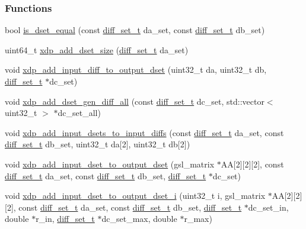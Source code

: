 \subsubsection*{\-Functions}
\begin{DoxyCompactItemize}
\item 
bool \hyperlink{xdp-add-diff-set_8hh_a3337e02c48bbe07e1e0d64da346c955f}{is\-\_\-dset\-\_\-equal} (const \hyperlink{structdiff__set__t}{diff\-\_\-set\-\_\-t} da\-\_\-set, const \hyperlink{structdiff__set__t}{diff\-\_\-set\-\_\-t} db\-\_\-set)
\item 
uint64\-\_\-t \hyperlink{xdp-add-diff-set_8hh_a93cd4e95c6e49a2837bc72fa68ffa1e5}{xdp\-\_\-add\-\_\-dset\-\_\-size} (\hyperlink{structdiff__set__t}{diff\-\_\-set\-\_\-t} da\-\_\-set)
\item 
void \hyperlink{xdp-add-diff-set_8hh_ae8f201e16a902384df5e9cb6cda1a7ad}{xdp\-\_\-add\-\_\-input\-\_\-diff\-\_\-to\-\_\-output\-\_\-dset} (uint32\-\_\-t da, uint32\-\_\-t db, \hyperlink{structdiff__set__t}{diff\-\_\-set\-\_\-t} $\ast$dc\-\_\-set)
\item 
void \hyperlink{xdp-add-diff-set_8hh_afb4ba884badd47b88a5f7cd9e68004e1}{xdp\-\_\-add\-\_\-dset\-\_\-gen\-\_\-diff\-\_\-all} (const \hyperlink{structdiff__set__t}{diff\-\_\-set\-\_\-t} dc\-\_\-set, std\-::vector$<$ uint32\-\_\-t $>$ $\ast$dc\-\_\-set\-\_\-all)
\item 
void \hyperlink{xdp-add-diff-set_8hh_a84427440715e6da72e843ff476f30c11}{xdp\-\_\-add\-\_\-input\-\_\-dsets\-\_\-to\-\_\-input\-\_\-diffs} (const \hyperlink{structdiff__set__t}{diff\-\_\-set\-\_\-t} da\-\_\-set, const \hyperlink{structdiff__set__t}{diff\-\_\-set\-\_\-t} db\-\_\-set, uint32\-\_\-t da\mbox{[}2\mbox{]}, uint32\-\_\-t db\mbox{[}2\mbox{]})
\item 
void \hyperlink{xdp-add-diff-set_8hh_a1d5e808d3045ecd90436865429a222f0}{xdp\-\_\-add\-\_\-input\-\_\-dset\-\_\-to\-\_\-output\-\_\-dset} (gsl\-\_\-matrix $\ast$\-A\-A\mbox{[}2\mbox{]}\mbox{[}2\mbox{]}\mbox{[}2\mbox{]}, const \hyperlink{structdiff__set__t}{diff\-\_\-set\-\_\-t} da\-\_\-set, const \hyperlink{structdiff__set__t}{diff\-\_\-set\-\_\-t} db\-\_\-set, \hyperlink{structdiff__set__t}{diff\-\_\-set\-\_\-t} $\ast$dc\-\_\-set)
\item 
void \hyperlink{xdp-add-diff-set_8hh_a8c216973d312f3bc4ebe2cc8ed0d3e8e}{xdp\-\_\-add\-\_\-input\-\_\-dset\-\_\-to\-\_\-output\-\_\-dset\-\_\-i} (uint32\-\_\-t i, gsl\-\_\-matrix $\ast$\-A\-A\mbox{[}2\mbox{]}\mbox{[}2\mbox{]}\mbox{[}2\mbox{]}, const \hyperlink{structdiff__set__t}{diff\-\_\-set\-\_\-t} da\-\_\-set, const \hyperlink{structdiff__set__t}{diff\-\_\-set\-\_\-t} db\-\_\-set, \hyperlink{structdiff__set__t}{diff\-\_\-set\-\_\-t} $\ast$dc\-\_\-set\-\_\-in, double $\ast$r\-\_\-in, \hyperlink{structdiff__set__t}{diff\-\_\-set\-\_\-t} $\ast$dc\-\_\-set\-\_\-max, double $\ast$r\-\_\-max)

\end{DoxyCompactItemize}
